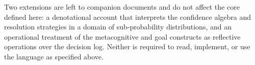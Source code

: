 \documentclass[11pt,a4paper]{article}
\theoremstyle{plain}
\theoremstyle{definition}
\theoremstyle{remark}
\begin{document}
Two extensions are left to companion documents and do not affect the core
defined here: a denotational account that interprets the confidence algebra and
resolution strategies in a domain of sub-probability distributions, and an
operational treatment of the metacognitive and goal constructs as reflective
operations over the decision log. Neither is required to read, implement, or use
the language as specified above.



\end{document}
